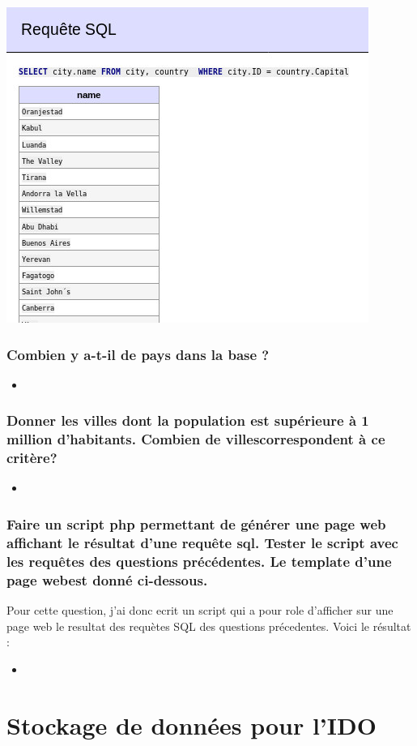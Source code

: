 \documentclass[a4paper,10pt]{article}
\newcommand{\insertcode}[2]{\begin{itemize}\item[]\end{itemize}}
\begin{document}
\includegraphics[scale=0.8]{ressource/3.jpg}

\newpage


\subsubsection{Combien y a-t-il de pays dans la base ? }
\insertcode{commande/5.txt}{count() }
\subsubsection{Donner les villes dont la population est supérieure à 1 million d’habitants. Combien de villescorrespondent à ce critère?}

\insertcode{commande/6.txt}{Requetes}

\subsubsection{Faire un script php permettant de générer une page web affichant le résultat d’une requête sql. Tester le script avec les requêtes des questions précédentes. Le template d’une page webest donné ci-dessous.}
Pour cette question, j'ai donc ecrit un script qui a pour role d'afficher sur une page web le resultat des requètes SQL des questions précedentes. Voici le résultat :
\insertcode{ressource/code.php}{php script}

\section{Stockage de données pour l’IDO}
\end{document}
